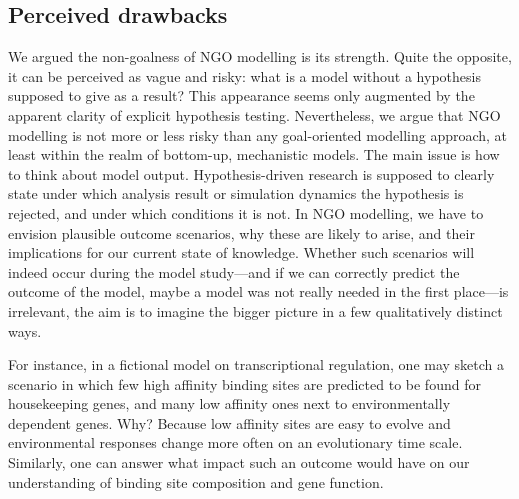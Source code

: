 \subsection{Perceived drawbacks}

We argued the non-goalness of NGO modelling is its strength. Quite the opposite, it can be perceived as vague and risky: what is a model without a hypothesis supposed to give as a result? This appearance seems only augmented by the apparent clarity of explicit hypothesis testing. Nevertheless, we argue that NGO modelling is not more or less risky than any goal-oriented modelling approach, at least within the realm of bottom-up, mechanistic models. The main issue is how to think about model output. Hypothesis-driven research is supposed to clearly state under which analysis result or simulation dynamics the hypothesis is rejected, and under which conditions it is not. In NGO modelling, we have to envision plausible outcome scenarios, why these are likely to arise, and their implications for our current state of knowledge. Whether such scenarios will indeed occur during the model study---and if we can correctly predict the outcome of the model, maybe a model was not really needed in the first place---is irrelevant, the aim is to imagine the bigger picture in a few qualitatively distinct ways.

For instance, in a fictional model on transcriptional regulation, one may sketch a scenario in which few high affinity binding sites are predicted to be found for housekeeping genes, and many low affinity ones next to environmentally dependent genes. Why? Because low affinity sites are easy to evolve and environmental responses change more often on an evolutionary time scale. Similarly, one can answer what impact such an outcome would have on our understanding of binding site composition and gene function.